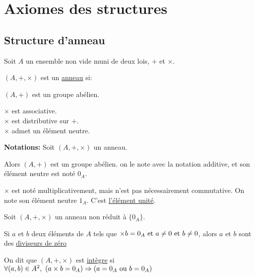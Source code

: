 \documentclass[12pt,twoside,a4paper]{article}
\author{MPSI 2}
\begin{document}
	\maketitle
	\section{Axiomes des structures}
		\subsection{Structure d'anneau}
			\begin{flushleft}
				Soit $A$ un ensemble non vide muni de deux lois, $+$ et $\times$.
			\end{flushleft}
			\begin{defi}
				$(A,+,\times)$ est un \underline{anneau} si:
				\begin{liste}
					\item[\cercle1]$(A,+)$ est un groupe ab\'elien.
					\item[\cercle2]$\times$ est associative.\\
						$\times$ est distributive sur $+$.\\
						$\times$ admet un \'el\'ement neutre.
				\end{liste}
			\end{defi}
			\begin{flushleft}
				\textbf{Notations:} Soit $(A,+,\times)$ un anneau.
				\begin{liste}
					\item Alors $(A,+)$ est un groupe ab\'elien. on le note avec la notation additive, et son \'el\'ement neutre est not\'e $0_A$.
					\item $\times$ est not\'e multiplicativement, mais n'est pas n\'ecessairement commutative. On note son \'el\'ement neutre $1_A$. C'est \underline{l'\'el\'ement unit\'e}.
				\end{liste}
			\end{flushleft}
			\begin{defi}
				Soit $(A,+,\times)$ un anneau non r\'eduit \`a $\{0_A\}$.
				\begin{liste}
					\item Si $a$ et $b$ deux \'el\'ements de $A$ tels que $\times b=0_A\text{ et } a\neq0\text{ et } b\neq0$, alors $a$ et $b$ sont des \underline{diviseurs de z\'ero}
					\item On dit que $(A,+,\times)$ est \underline{int\`egre} si $\forall (a,b)\in A^{2},\ (a\times b=0_A)\Rightarrow (a=0_A\text{ ou } b=0_A)$
				\end{liste}
			\end{defi}
\end{document}
